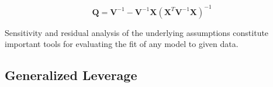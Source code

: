 \documentclass[Main.tex]{subfiles}
\begin{document}
\[ \boldsymbol{Q} = \boldsymbol{V}^{-1} - \boldsymbol{V}^{-1}\boldsymbol{X} ( \boldsymbol{X}^{T} \boldsymbol{V}^{-1} \boldsymbol{X})^{-1} \]


Sensitivity and residual analysis of the underlying assumptions constitute important tools for evaluating the fit of any model to given data.


\subsection*{Generalized Leverage}



%
%
\end{document}
